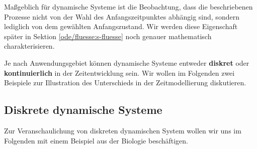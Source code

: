 \documentclass[letterpaper,10pt,english]{jupyterBook}
\begin{document}
Maßgeblich für dynamische Systeme ist die Beobachtung, dass die beschriebenen Prozesse nicht von der Wahl des Anfangszeitpunktes abhängig sind, sondern lediglich von dem gewählten Anfangszustand.
Wir werden diese Eigenschaft später in Sektion \cref{ode/fluesse:s-fluesse}  noch genauer mathematisch charakterisieren.

Je nach Anwendungsgebiet können dynamische Systeme entweder \textbf{diskret} oder \textbf{kontinuierlich} in der Zeitentwicklung sein.
Wir wollen im Folgenden zwei Beispiele zur Illustration des Unterschieds in der Zeitmodellierung diskutieren.


\subsection{Diskrete dynamische Systeme}
\label{\detokenize{ode/dynamicSystems:diskrete-dynamische-systeme}}
Zur Veranschaulichung von diskreten dynamischen System wollen wir uns im Folgenden mit einem Beispiel aus der Biologie beschäftigen.
\label{ode/dynamicSystems:ex:bacteria}
\end{document}
